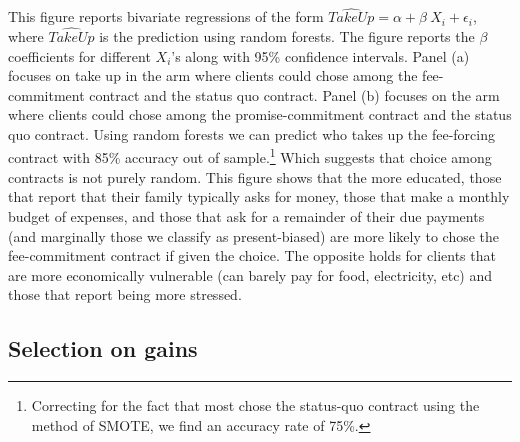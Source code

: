 \scriptsize {
\noindent This figure reports bivariate regressions of the form $\widehat{TakeUp} = \alpha + \beta \: X_i + \epsilon_i$, where $\widehat{TakeUp}$ is the prediction using random forests. The figure reports the $\beta$ coefficients for different $X_i$'s along with 95\% confidence intervals. Panel (a) focuses on take up in the arm where clients could chose among the fee-commitment contract and the status quo contract. Panel (b) focuses on the arm where clients could chose among the promise-commitment contract and the status quo contract. Using random forests we can predict who takes up the fee-forcing contract with 85\% accuracy out of sample.\footnote{Correcting for the fact that most chose the status-quo contract using the method of SMOTE, \cite{smote} we find an accuracy rate of 75\%.} Which suggests that choice among contracts is not purely random. This figure shows that the more educated, those that report that their family typically asks for money, those that make a monthly budget of expenses, and those that ask for a remainder of their due payments (and marginally those we classify as present-biased) are more likely to chose the fee-commitment contract if given the choice. The opposite holds for clients that are more economically vulnerable (can barely pay for food, electricity, etc) and those that report being more stressed.
}

\newpage

\subsection{Selection on gains}


